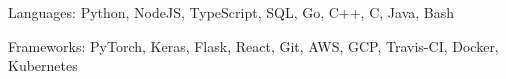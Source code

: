 


\begin{cvskills}


\cvskill
{Languages:} %
{Python, NodeJS, TypeScript, SQL, Go, C++, C, Java, Bash} %


\cvskill
{Frameworks:} %
{PyTorch, Keras, Flask, React, Git, AWS, GCP, Travis-CI, Docker, Kubernetes}


\end{cvskills}